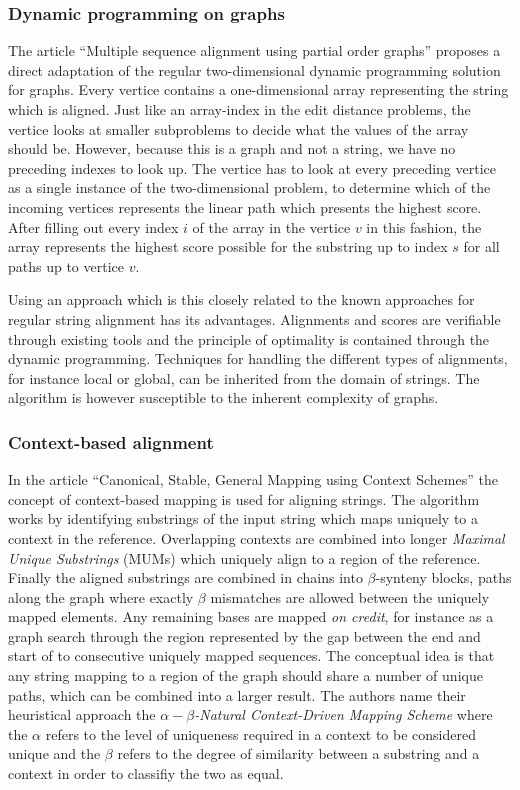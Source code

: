 \documentclass[thesis.tex]{subfiles}
\begin{document}
\subsubsection{Dynamic programming on graphs}
The article ``Multiple sequence alignment using partial order graphs'' proposes a direct adaptation of the regular two-dimensional dynamic programming solution for graphs. Every vertice contains a one-dimensional array representing the string which is aligned. Just like an array-index in the edit distance problems, the vertice looks at smaller subproblems to decide what the values of the array should be. However, because this is a graph and not a string, we have no preceding indexes to look up. The vertice has to look at every preceding vertice as a single instance of the two-dimensional problem, to determine which of the incoming vertices represents the linear path which presents the highest score. After filling out every index $i$ of the array in the vertice $v$ in this fashion, the array represents the highest score possible for the substring up to index $s$ for all paths up to vertice $v$.\\
\par\noindent
Using an approach which is this closely related to the known approaches for regular string alignment has its advantages. Alignments and scores are verifiable through existing tools and the principle of optimality is contained through the dynamic programming. Techniques for handling the different types of alignments, for instance local or global, can be inherited from the domain of strings. The algorithm is however susceptible to the inherent complexity of graphs.
\label{sec:po_msa}
\subsubsection{Context-based alignment}
In the article ``Canonical, Stable, General Mapping using Context Schemes''\cite{canonical_stable_general_mapping_using_context_schemes} the concept of context-based mapping is used for aligning strings. The algorithm works by identifying substrings of the input string which maps uniquely to a context in the reference. Overlapping contexts are combined into longer \textit{Maximal Unique Substrings} (MUMs) which uniquely align to a region of the reference. Finally the aligned substrings are combined in chains into $\beta$-synteny blocks, paths along the graph where exactly $\beta$ mismatches are allowed between the uniquely mapped elements. Any remaining bases are mapped \textit{on credit}, for instance as a graph search through the region represented by the gap between the end and start of to consecutive uniquely mapped sequences. The conceptual idea is that any string mapping to a region of the graph should share a number of unique paths, which can be combined into a larger result. The authors name their heuristical approach the \textit{$\alpha-\beta$-Natural Context-Driven Mapping Scheme} where the $\alpha$ refers to the level of uniqueness required in a context to be considered unique and the $\beta$ refers to the degree of similarity between a substring and a context in order to classifiy the two as equal.
\end{document}
